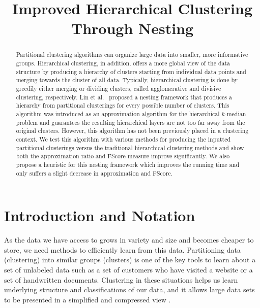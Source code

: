 \documentclass[conference, 10pt, final]{IEEEtran}
\begin{document}
 

\title{Improved Hierarchical Clustering Through Nesting}


\author{
}


\maketitle

\begin{abstract}
Partitional clustering algorithms can organize large data into smaller, more informative groups. Hierarchical clustering, in addition, offers a more global view of the data structure by producing a hierarchy of clusters starting from individual data points and merging towards the cluster of all data. Typically, hierarchical clustering is done by greedily either merging or dividing clusters, called agglomerative and divisive clustering, respectively. Lin et al.~\cite{Lin} proposed a nesting framework that produces a hierarchy from partitional clusterings for every possible number of clusters. This algorithm was introduced as an approximation algorithm for the hierarchical $k$-median problem and guarantees the resulting hierarchical layers are not too far away from the original clusters. However, this algorithm has not been previously placed in a clustering context. We test this algorithm with various methods for producing the inputted partitional clusterings versus the traditional hierarchical clustering methods and show both the approximation ratio and FScore measure improve significantly. We also propose a heuristic for this nesting framework which improves the running time and only suffers a slight decrease in approximation and FScore.
\end{abstract}


\section{Introduction and Notation}
As the data we have access to grows in variety and size and becomes cheaper to store, we need methods to efficiently learn from this data. 
Partitioning data (clustering) into similar groups (clusters) is one of the key tools to learn about a set of unlabeled data such as a set of customers who have visited a website or a set of handwritten documents.
Clustering in these situations helps us learn underlying structure and classifications of our data, and it allows large data sets to be presented in a simplified and compressed view \cite{Jain}.
\end{document}
